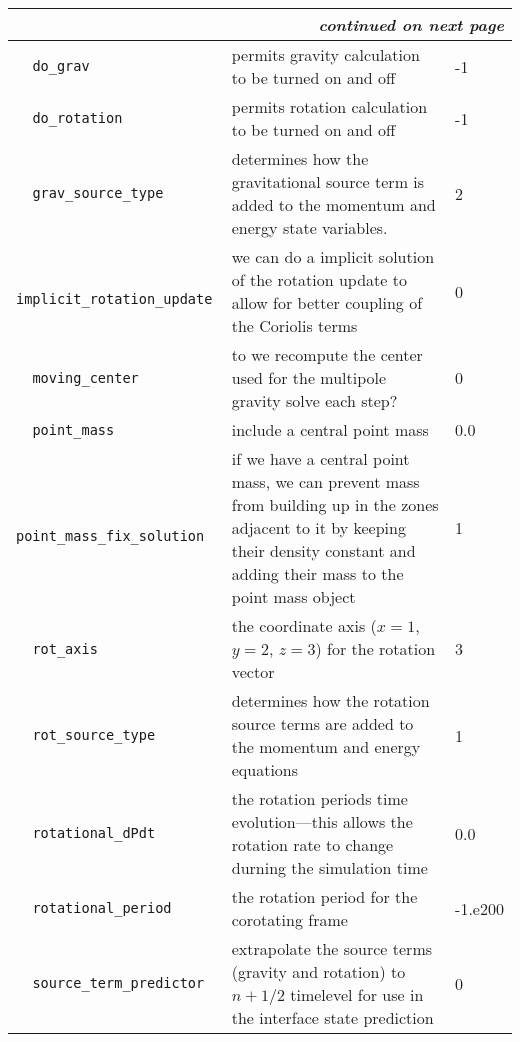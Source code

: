 \begin{landscape}
{\begin{center}
\begin{longtable}{|l|p{5.25in}|l|}
\multicolumn{3}{|r|}{{\em continued on next page}} \\ \hline
\endfoot

\hline 
\endlastfoot


\rowcolor{tableShade}
\verb=  do_grav  = &   permits gravity calculation to be turned on and off  &  -1 \\
\verb=  do_rotation  = &   permits rotation calculation to be turned on and off  &  -1 \\
\rowcolor{tableShade}
\verb=  grav_source_type  = &   determines how the gravitational source term is added to the momentum and energy state variables.  &  2 \\
\verb=  implicit_rotation_update  = &   we can do a implicit solution of the rotation update to allow for better coupling of the Coriolis terms  &  0 \\
\rowcolor{tableShade}
\verb=  moving_center  = &   to we recompute the center used for the multipole gravity solve each step?  &  0 \\
\verb=  point_mass  = &   include a central point mass  &  0.0 \\
\rowcolor{tableShade}
\verb=  point_mass_fix_solution  = &   if we have a central point mass, we can prevent mass from building up in the zones adjacent to it by keeping their density constant and adding their mass to the point mass object  &  1 \\
\verb=  rot_axis  = &   the coordinate axis ($x=1$, $y=2$, $z=3$) for the rotation vector  &  3 \\
\rowcolor{tableShade}
\verb=  rot_source_type  = &   determines how the rotation source terms are added to the momentum and energy equations  &  1 \\
\verb=  rotational_dPdt  = &   the rotation periods time evolution---this allows the rotation rate to change durning the simulation time  &  0.0 \\
\rowcolor{tableShade}
\verb=  rotational_period  = &   the rotation period for the corotating frame  &  -1.e200 \\
\verb=  source_term_predictor  = &   extrapolate the source terms (gravity and rotation) to $n+1/2$ timelevel for use in the interface state prediction  &  0 \\


\end{longtable}
\end{center}

} %


{\small

}
\end{landscape}
